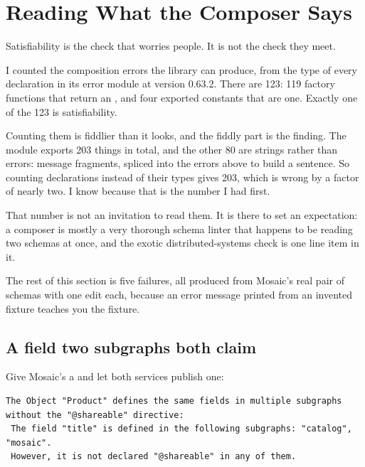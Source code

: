 \section{Reading What the Composer Says}
\label{sec:ch09-reading-the-errors}
%

Satisfiability is the check that worries people. It is not the check they meet.

%
I counted the composition errors the library can produce, from the type of every
declaration in its error module at version 0.63.2. There are 123: 119 factory
functions that return an , and four exported constants that are one.
Exactly one of the 123 is satisfiability.

Counting them is fiddlier than it looks, and the fiddly part is the finding. The
module exports 203 things in total, and the other 80 are strings rather than
errors: message fragments, spliced into the errors above to build a sentence. So
counting declarations instead of their types gives 203, which is wrong by a
factor of nearly two. I know because that is the number I had first.

That number is not an invitation to read them. It is there to set an
expectation: a composer is mostly a very thorough schema linter that happens to
be reading two schemas at once, and the exotic distributed-systems check is one
line item in it.

The rest of this section is five failures, all produced from Mosaic's real pair
of schemas with one edit each, because an error message printed from an invented
fixture teaches you the fixture.

\subsection*{A field two subgraphs both claim}

%
Give Mosaic's  a  and let both services publish one:

\begin{verbatim}
The Object "Product" defines the same fields in multiple subgraphs without the "@shareable" directive:
 The field "title" is defined in the following subgraphs: "catalog", "mosaic".
 However, it is not declared "@shareable" in any of them.
\end{verbatim}

